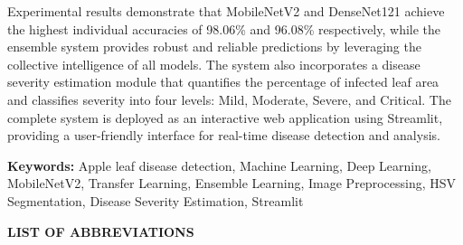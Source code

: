 \documentclass[12pt]{report}
\begin{document}
Experimental results demonstrate that MobileNetV2 and DenseNet121 achieve the highest individual accuracies of 98.06\% and 96.08\% respectively, while the ensemble system provides robust and reliable predictions by leveraging the collective intelligence of all models. The system also incorporates a disease severity estimation module that quantifies the percentage of infected leaf area and classifies severity into four levels: Mild, Moderate, Severe, and Critical. The complete system is deployed as an interactive web application using Streamlit, providing a user-friendly interface for real-time disease detection and analysis.

\textbf{Keywords:} Apple leaf disease detection, Machine Learning, Deep Learning, MobileNetV2, Transfer Learning, Ensemble Learning, Image Preprocessing, HSV Segmentation, Disease Severity Estimation, Streamlit

\newpage
\tableofcontents

\newpage
\listoffigures

\newpage
\listoftables

\newpage
\thispagestyle{fancy}
\begin{center}
\textbf{\large LIST OF ABBREVIATIONS}
\end{center}
\vspace{1cm}
\end{document}
